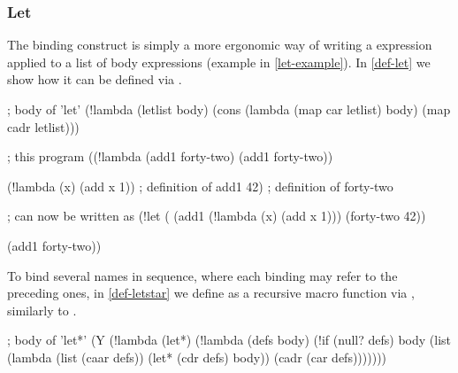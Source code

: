 \subsubsection{Let}
The binding construct  is simply a more ergonomic way
of writing a  expression applied to a list of body expressions
(example in \cref{let-example}).
In \cref{def-let} we show how it can be defined via .
\begin{listingbox}\begin{ildcode}
; body of 'let'
(!lambda (letlist body)
  (cons
    (lambda
      (map car letlist)
      body)
    (map cadr letlist)))
\end{ildcode}\end{listingbox}
\label{def-let}

\begin{listingbox}\begin{ildcode}
; this program
  ((!lambda (add1 forty-two)
      (add1 forty-two))

      (!lambda (x)
        (add x 1)) ; definition of add1
      42)          ; definition of forty-two

; can now be written as
  (!let (
      (add1 (!lambda (x)
              (add x 1)))
      (forty-two  42))

    (add1 forty-two))
\end{ildcode}\end{listingbox}
\label{let-example}
To bind several names in sequence, where each binding may refer to the
preceding ones, in \cref{def-letstar} we define  as a recursive
macro function via , similarly to .
\begin{listingbox}\begin{ildcode}
; body of 'let*'
(Y (!lambda (let*)
  (!lambda (defs body)
    (!if (null? defs)
      body
      (list
        (lambda (list (caar defs))
          (let* (cdr defs) body))
        (cadr (car defs)))))))
\end{ildcode}\end{listingbox}
\label{def-letstar}

